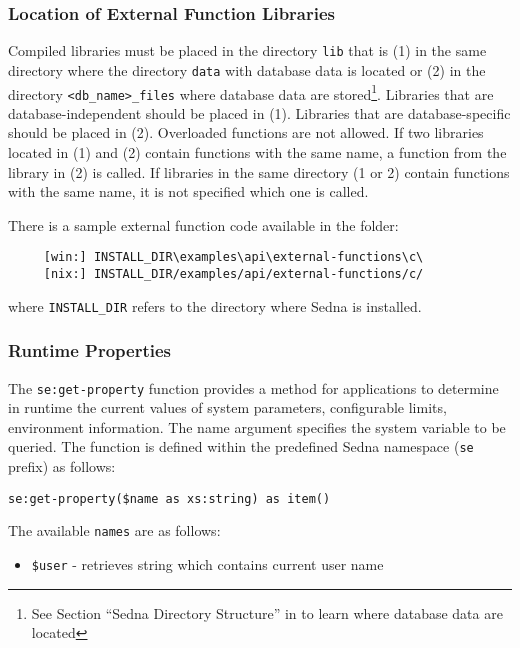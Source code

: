 \documentclass[a4paper,12pt]{article}
\begin{document}
\subsubsection*{Location of External Function Libraries}
Compiled libraries must be placed in the directory \verb!lib! that is (1) in the
same directory where the directory \verb!data! with database data is located or
(2) in the directory \verb!<db_name>_files! where database data are
stored\footnote{See Section ``Sedna Directory Structure'' in \cite{doc:admin} to
learn where database data are located}. Libraries that are database-independent
should be placed in (1). Libraries that are database-specific should be placed
in (2). Overloaded functions are not allowed. If two libraries located in (1)
and (2) contain functions with the same name, a function from the library in (2)
is called. If libraries in the same directory (1 or 2) contain functions with
the same name, it is not specified which one is called.

There is a sample external function code available in the folder:
\begin{verbatim}
     [win:] INSTALL_DIR\examples\api\external-functions\c\
     [nix:] INSTALL_DIR/examples/api/external-functions/c/
\end{verbatim}
where \verb!INSTALL_DIR! refers to the directory where Sedna is installed.


\subsubsection{Runtime Properties}

The \verb!se:get-property! function provides a method for applications to
determine in runtime the current values of system parameters, configurable
limits, environment information. The name argument specifies the system variable
to be queried. The function is defined within the predefined Sedna namespace
(\verb!se! prefix) as follows:

\begin{verbatim}
se:get-property($name as xs:string) as item()
\end{verbatim}

The available \verb!names! are as follows:

\begin{itemize}
\item\verb!$user! - retrieves string which contains current user name
\end{itemize}
\end{document}
